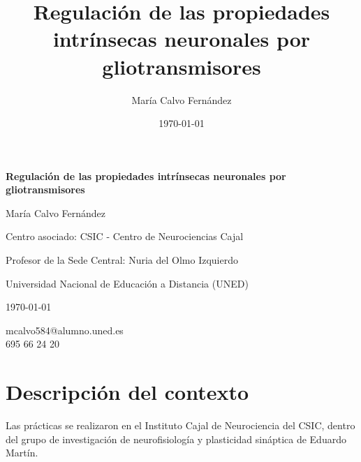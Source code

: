 \documentclass[12pt,a4paper]{report}
\title{
    \vspace{4cm}
    \textbf{Regulación de las propiedades intrínsecas neuronales por gliotransmisores}\\
    \vspace{1cm}
}
\author{María Calvo Fernández}
\date{\today}
\begin{document}
\begin{titlepage}
    \centering

    \vspace*{3cm}

    {\Huge \textbf{Regulación de las propiedades intrínsecas neuronales por gliotransmisores} \par}

    \vspace{2cm}

    {\Large María Calvo Fernández \par}

    \vfill

    {\large Centro asociado: CSIC - Centro de Neurociencias Cajal \par}

    {\large Profesor de la Sede Central: Nuria del Olmo Izquierdo \par}

    \vspace{0.5cm}

    {\large Universidad Nacional de Educación a Distancia (UNED) \par}

    {\large \today \par}

    \vspace{2cm}

    \begin{flushleft}
    \small
    mcalvo584@alumno.uned.es \\
    695 66 24 20
    \end{flushleft}

\end{titlepage}

\tableofcontents
\newpage

\chapter{Descripción del contexto}

Las prácticas se realizaron en el Instituto Cajal de Neurociencia del CSIC, dentro del grupo de investigación de neurofisiología y plasticidad sináptica de Eduardo Martín. 
\end{document}
